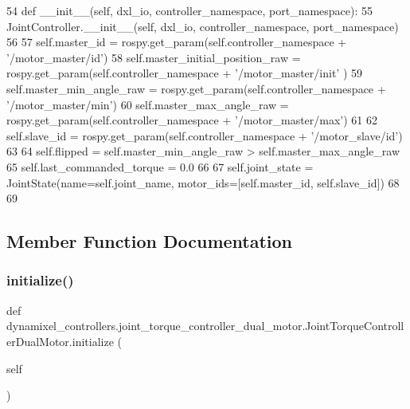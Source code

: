 \begin{DoxyCode}
54     \textcolor{keyword}{def }\_\_init\_\_(self, dxl\_io, controller\_namespace, port\_namespace):
55         JointController.\_\_init\_\_(self, dxl\_io, controller\_namespace, port\_namespace)
56         
57         self.master\_id = rospy.get\_param(self.controller\_namespace + \textcolor{stringliteral}{'/motor\_master/id'})
58         self.master\_initial\_position\_raw = rospy.get\_param(self.controller\_namespace + \textcolor{stringliteral}{'/motor\_master/init'}
      )
59         self.master\_min\_angle\_raw = rospy.get\_param(self.controller\_namespace + \textcolor{stringliteral}{'/motor\_master/min'})
60         self.master\_max\_angle\_raw = rospy.get\_param(self.controller\_namespace + \textcolor{stringliteral}{'/motor\_master/max'})
61         
62         self.slave\_id = rospy.get\_param(self.controller\_namespace + \textcolor{stringliteral}{'/motor\_slave/id'})
63         
64         self.flipped = self.master\_min\_angle\_raw > self.master\_max\_angle\_raw
65         self.last\_commanded\_torque = 0.0
66         
67         self.joint\_state = JointState(name=self.joint\_name, motor\_ids=[self.master\_id, self.slave\_id])
68 
69 
\end{DoxyCode}


\subsection{Member Function Documentation}
\mbox{\label{classdynamixel__controllers_1_1joint__torque__controller__dual__motor_1_1_joint_torque_controller_dual_motor_a02bd4c16843e2e44bdd210395e83efb5}} 
\subsubsection{\texorpdfstring{initialize()}{initialize()}}
{\footnotesize\ttfamily def dynamixel\+\_\+controllers.\+joint\+\_\+torque\+\_\+controller\+\_\+dual\+\_\+motor.\+Joint\+Torque\+Controller\+Dual\+Motor.\+initialize (\begin{DoxyParamCaption}\item[{}]{self }\end{DoxyParamCaption})}



